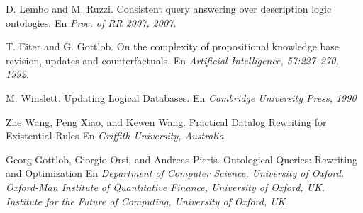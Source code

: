 \documentclass[11pt,a4paper,twoside]{tesis}
\begin{document}
\begin{thebibliography}{9}
    D. Lembo and M. Ruzzi.
    Consistent query answering over description logic ontologies.
    En \textit{Proc. of RR 2007, 2007.} 
    
    T. Eiter and G. Gottlob.
    On the complexity of propositional knowledge base revision, updates and counterfactuals.
    En \textit{Artificial Intelligence, 57:227–270, 1992.} 
    
    M. Winslett.
    Updating Logical Databases.
    En \textit{Cambridge University Press, 1990} 
    
    Zhe Wang, Peng Xiao, and Kewen Wang.
    Practical Datalog Rewriting for Existential Rules
    En \textit{Griffith University, Australia} 
    
    Georg Gottlob, Giorgio Orsi, and Andreas Pieris.
    Ontological Queries: Rewriting and Optimization
    En \textit{Department of Computer Science, University of Oxford. Oxford-Man Institute of Quantitative Finance, University of Oxford, UK. Institute for the Future of Computing, University of Oxford, UK } 





    \end{thebibliography}
\end{document}
